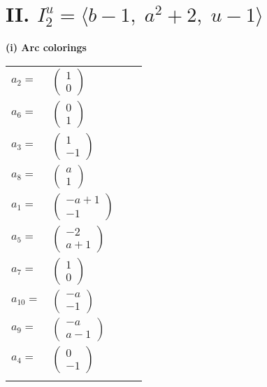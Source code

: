 \documentclass[1p]{elsarticle_modified}
\theoremstyle{definition}
\begin{document}
\centering \section*{II. $I^u_{2}= \langle b-1,\;a^2+2,\;u-1 \rangle$}
\flushleft \textbf{(i) Arc colorings}\\
\begin{tabular}{m{7pt} m{180pt} m{7pt} m{180pt} }
\flushright $a_{2}=$&$\begin{pmatrix}1\\0\end{pmatrix}$ \\
\flushright $a_{6}=$&$\begin{pmatrix}0\\1\end{pmatrix}$ \\
\flushright $a_{3}=$&$\begin{pmatrix}1\\-1\end{pmatrix}$ \\
\flushright $a_{8}=$&$\begin{pmatrix}a\\1\end{pmatrix}$ \\
\flushright $a_{1}=$&$\begin{pmatrix}- a+1\\-1\end{pmatrix}$ \\
\flushright $a_{5}=$&$\begin{pmatrix}-2\\a+1\end{pmatrix}$ \\
\flushright $a_{7}=$&$\begin{pmatrix}1\\0\end{pmatrix}$ \\
\flushright $a_{10}=$&$\begin{pmatrix}- a\\-1\end{pmatrix}$ \\
\flushright $a_{9}=$&$\begin{pmatrix}- a\\a-1\end{pmatrix}$ \\
\flushright $a_{4}=$&$\begin{pmatrix}0\\-1\end{pmatrix}$\\&\end{tabular}
\end{document}
